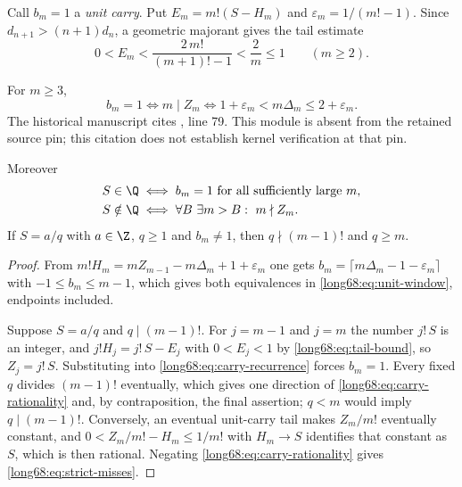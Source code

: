 \documentclass[11pt]{article}
\newcommand{\Ser}{S}
\begin{document}
Call $b_m=1$ a \emph{unit carry}.  Put
$E_m=m!(\Ser-H_m)$ and $\varepsilon_m=1/(m!-1)$.  Since
$d_{n+1}>(n+1)d_n$, a geometric majorant gives the tail estimate
\begin{equation}\label{long68:eq:tail-bound}
 0<E_m<\frac{2\,m!}{(m+1)!-1}<\frac2m\le1\qquad(m\ge2).
\end{equation}

\label{long68:res:lead-carry-equivalence}
\label{long68:res:strict-successor-complete-characterization}
\begin{theorem}\label{long68:res:carry-equivalence}
For $m\ge3$,
\begin{equation}\label{long68:eq:unit-window}
 b_m=1
 \iff m\mid Z_m
 \iff 1+\varepsilon_m<m\Delta_m\le2+\varepsilon_m .
\end{equation}
  The historical manuscript cites , line 79. This module is absent from the retained source pin; this citation does not establish kernel verification at that pin.

Moreover
\begin{align}
 \Ser\in\Q
 &\iff b_m=1\ \hbox{for all sufficiently large }m,
 \label{long68:eq:carry-rationality}\\
 \Ser\notin\Q
 &\iff \forall B\ \exists m>B:\ m\nmid Z_m .
 \label{long68:eq:strict-misses}
\end{align}
If $\Ser=a/q$ with $a\in\Z$, $q\ge1$ and $b_m\ne1$, then $q\nmid(m-1)!$ and
$q\ge m$.
\end{theorem}

\begin{proof}
From $m!H_m=mZ_{m-1}-m\Delta_m+1+\varepsilon_m$ one gets
$b_m=\lceil m\Delta_m-1-\varepsilon_m\rceil$ with $-1\le b_m\le m-1$, which
gives both equivalences in \eqref{long68:eq:unit-window}, endpoints included.

Suppose $\Ser=a/q$ and $q\mid(m-1)!$.  For $j=m-1$ and $j=m$ the number
$j!\,\Ser$ is an integer, and $j!H_j=j!\,\Ser-E_j$ with $0<E_j<1$ by
\eqref{long68:eq:tail-bound}, so $Z_j=j!\,\Ser$.  Substituting into
\eqref{long68:eq:carry-recurrence} forces $b_m=1$.  Every fixed $q$ divides
$(m-1)!$ eventually, which gives one direction of
\eqref{long68:eq:carry-rationality} and, by contraposition, the final assertion;
$q<m$ would imply $q\mid(m-1)!$.  Conversely, an eventual unit-carry tail
makes $Z_m/m!$ eventually constant, and $0<Z_m/m!-H_m\le1/m!$ with
$H_m\to\Ser$ identifies that constant as $\Ser$, which is then rational.
Negating \eqref{long68:eq:carry-rationality} gives \eqref{long68:eq:strict-misses}.
\end{proof}
\end{document}
